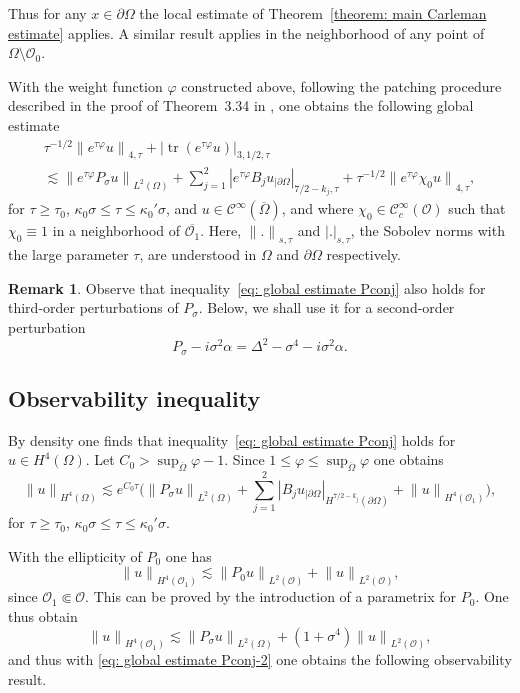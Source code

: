 \documentclass[10pt]{amsart}
\theoremstyle{plain}
\theoremstyle{definition}
\newtheorem{remark}[theorem]{Remark}
\newcommand{\nhd}{neighborhood\xspace}
\let\k\kappa
\newcommand{\ovl}[1]{\overline{#1}}
\newcommand{\scrO}{\mathscr O}
\newcommand{\bd}{\ensuremath{_{|\partial\Omega}}}
\newcommand{\Norm}[2]{{\| #1 \|}_{#2}}
\newcommand{\norm}[2]{{|#1|}_{#2}}
\newcommand{\Normsc}[2]{{\| #1 \|}_{#2, \tau}}
\newcommand{\normsc}[2]{{| #1 |}_{#2, \tau}}
\newcommand{\Psig}{P_{\sigma}}
\newcommand{\Con}{\ensuremath{\mathscr C}}
\newcommand{\Cinf}{\ensuremath{\Con^\infty}}
\newcommand{\Cinfc}{\ensuremath{\Con^\infty_c}}
\DeclareMathOperator{\trace}{tr}
\begin{document}
Thus for any $x \in \partial \Omega$ the local estimate of
Theorem~\ref{theorem: main Carleman estimate} applies.
A similar result applies in the \nhd of any point of $\Omega
\setminus \scrO_0$.

With the weight function $\varphi$
constructed above, following the patching procedure described in the proof of Theorem~3.34 in
\cite{JGL-vol1}, one obtains the following global estimate
\begin{multline}\label{eq: global estimate Pconj}
\tau^{-1/2} \Normsc{e^{\tau \varphi} u}{4}
+ \normsc{ \trace(e^{\tau \varphi} u)}{3,1/2}\\
\lesssim
\Norm{e^{\tau \varphi} \Psig u}{L^2(\Omega)}
+ \sum_{j=1}^{2} \normsc{e^{\tau \varphi} B_{j}u\bd}{7/2-k_{j}}
+ \tau^{-1/2} \Normsc{e^{\tau \varphi} \chi_0 u}{4},
\end{multline}
for $\tau\geq \tau_0$,
$\k_0 \sigma \leq \tau \leq \k_0' \sigma $, and $u\in
\Cinf(\ovl{\Omega})$, and where $\chi_0 \in \Cinfc(\scrO)$ such that
$\chi_0 \equiv 1$ in a \nhd of $\ovl{\scrO_1}$.
Here, $\Normsc{.}{s}$ and $\normsc{.}{s}$, the Sobolev norms with the large parameter $\tau$,
are understood
in $\Omega$ and $\partial\Omega$ respectively.

\begin{remark}
\label{remark: global estimate third-order perturbation}
Observe that inequality~\eqref{eq: global estimate Pconj} also holds
for third-order perturbations of $\Psig$. Below, we shall use it for
a second-order perturbation
\[
\Psig-i \sigma^2 \alpha = \Delta^2 -\sigma^4 -i \sigma^2 \alpha .
\]
\end{remark}

\subsection{Observability inequality}

By density one finds that inequality~\ref{eq: global estimate Pconj}
holds for $u \in H^4(\Omega)$.
Let $ C_0 > \sup_{\ovl{\Omega}}\varphi-1$. Since $1 \leq \varphi
\leq \sup_{\ovl{\Omega}}\varphi$ one obtains
\begin{equation}\label{eq: global estimate Pconj-2}
\Norm{u}{H^4(\Omega)}
\lesssim
e^{C_0 \tau} \big(\Norm{\Psig u}{L^2(\Omega)}
+ \sum_{j=1}^{2} \norm{ B_{j}u\bd}{H^{7/2-k_j}(\partial \Omega)}
+ \Norm{u}{H^4(\scrO_1)}
\big),
\end{equation}
for $\tau\geq \tau_0$,
$\k_0 \sigma \leq \tau \leq \k_0' \sigma $.

With the ellipticity of $P_0$ one has
\begin{equation*}
\Norm{u}{H^4(\scrO_1)}
\lesssim \Norm{P_0 u}{L^2(\scrO)}
+ \Norm{u}{L^2(\scrO)},
\end{equation*}
since $\scrO_1 \Subset \scrO$. This can be proved by the introduction
of a parametrix for $P_0$.
One thus obtain
\begin{equation*}
\Norm{u}{H^4(\scrO_1)}
\lesssim \Norm{\Psig u}{L^2(\Omega)}
+ (1+ \sigma^4) \Norm{u}{L^2(\scrO)},
\end{equation*}
and thus with \eqref{eq: global estimate Pconj-2} one obtains the
following observability result.
\end{document}
